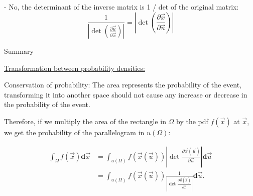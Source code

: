 \begin{frame}{\subsubsecname}


\pause

- No, the determinant of the inverse matrix is 1 / det of the original matrix:
\begin{equation}
\frac{1}{\left| \det \left( \frac{\partial \vec u}{\partial \vec x} \right) \right|} =
{\left| \det \left( \frac{\partial \vec x}{\partial \vec u} \right) \right|}
\end{equation}

\end{frame}

\begin{frame}{Summary}

\underline{Transformation between probability densities:}

Conservation of probability: The area represents the probability of the event, 
transforming it into another space should not cause any increase or decrease in the probability of the event.

Therefore, if we multiply the area of the rectangle in $\Omega$ by the pdf $f(\vec x)$ at $\vec x$, we get the probability of the parallelogram in $u(\Omega)$:

\begin{align}
\int_{\Omega} f(\vec{x}) \mathbf{d}\vec{x}
&=\int_{u(\Omega)} f({\vec x(\vec u)}) \left|\det \frac{\partial \vec{x}(\vec{u})}{\partial \vec{u}} \right| \mathbf{d}\vec{u}\\
&=\int_{u(\Omega)} f({\vec x(\vec u)}) \frac{1}{\left|\det \frac{\partial \vec{u}(\vec{x})}{\partial \vec{x}} \right|} \mathbf{d}\vec{u}.
\end{align}

\end{frame}

